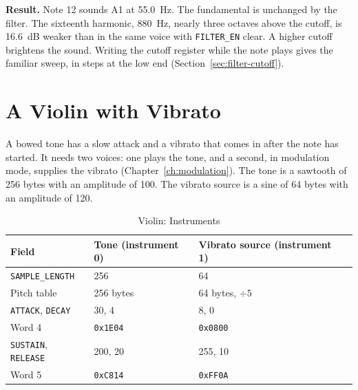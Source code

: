 \textbf{Result.} Note 12 sounds A1 at 55.0~Hz. The fundamental is unchanged by the filter. The sixteenth harmonic,
880~Hz, nearly three octaves above the cutoff, is 16.6~dB weaker than in the same voice with \texttt{FILTER\_EN}
clear. A higher cutoff brightens the sound. Writing the cutoff register while the note plays gives the familiar sweep,
in steps at the low end (Section~\ref{sec:filter-cutoff}).

\section{A Violin with Vibrato}

A bowed tone has a slow attack and a vibrato that comes in after the note has started. It needs two voices: one plays
the tone, and a second, in modulation mode, supplies the vibrato (Chapter~\ref{ch:modulation}). The tone is a sawtooth
of 256 bytes with an amplitude of 100. The vibrato source is a sine of 64 bytes with an amplitude of 120.

\begin{table}[H]
	\centering
	\begin{tabular}{llll}
		\toprule
		\textbf{Field}                     & \textbf{Tone (instrument 0)} & \textbf{Vibrato source (instrument 1)} \\
		\midrule
		\texttt{SAMPLE\_LENGTH}            & 256                          & 64                                     \\
		Pitch table                        & 256 bytes                    & 64 bytes, $\div 5$                     \\
		\texttt{ATTACK}, \texttt{DECAY}    & 30, 4                        & 8, 0                                   \\
		Word 4                             & \texttt{0x1E04}              & \texttt{0x0800}                        \\
		\texttt{SUSTAIN}, \texttt{RELEASE} & 200, 20                      & 255, 10                                \\
		Word 5                             & \texttt{0xC814}              & \texttt{0xFF0A}                        \\
		\bottomrule
	\end{tabular}
	\caption{Violin: Instruments}
	\label{tab:ex-violin}
\end{table}

